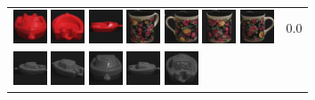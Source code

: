 {\begin{figure}[p]
\begin{tabular}{m{11cm} | m{3cm} |}
\includegraphics[width=1cm]{coil/beeld-20.eps}
\includegraphics[width=1cm]{coil/beeld-23.eps}
\includegraphics[width=1cm]{coil/beeld-19.eps}
\includegraphics[width=1cm]{coil/beeld-63.eps}
\includegraphics[width=1cm]{coil/beeld-61.eps}
\includegraphics[width=1cm]{coil/beeld-62.eps}
\includegraphics[width=1cm]{coil/beeld-60.eps}
& {\scriptsize 0.0}
\\
\includegraphics[width=1cm]{coil/beeld-24.eps}
\includegraphics[width=1cm]{coil/beeld-25.eps}
\includegraphics[width=1cm]{coil/beeld-28.eps}
\includegraphics[width=1cm]{coil/beeld-27.eps}
\includegraphics[width=1cm]{coil/beeld-26.eps}

\end{tabular}
\end{figure}}
